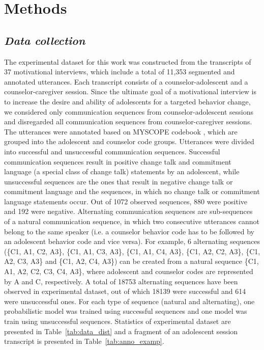 \documentclass{amia_summit_2018}
\begin{document}
\section*{Methods}
\subsection*{\textit{Data collection}}
The experimental dataset for this work was constructed from the transcripts of 37 motivational interviews, which include a total of 11,353 segmented and annotated utterances. Each transcript consists of a counselor-adolescent and a counselor-caregiver session. Since the ultimate goal of a motivational interview is to increase the desire and ability of adolescents for a targeted behavior change, we considered only communication sequences from counselor-adolescent sessions and disregarded all communication sequences from counselor-caregiver sessions. The utterances were annotated based on MYSCOPE codebook \cite{carcone2013provider}, which are grouped into the adolescent and counselor code groups. Utterances were divided into successful and unsuccessful communication sequences. Successful communication sequences result in positive change talk and commitment language (a special class of change talk) statements by an adolescent, while unsuccessful sequences are the ones that result in negative change talk or commitment language and the sequences, in which no change talk or commitment language statements occur. Out of 1072 observed sequences, 880 were positive and 192 were negative. Alternating communication sequences are sub-sequences of a natural communication sequence, in which two consecutive utterances cannot belong to the same speaker (i.e. a counselor behavior code has to be followed by an adolescent behavior code and vice versa). For example, 6 alternating sequences (\{C1, A1, C2, A3\}, \{C1, A1, C3, A3\}, \{C1, A1, C4, A3\}, \{C1, A2, C2, A3\}, \{C1, A2, C3, A3\} and \{C1, A2, C4, A3\}) can be created from a natural sequence \{C1, A1, A2, C2, C3, C4, A3\}, where adolescent and counselor codes are represented by A and C, respectively. A total of 18753 alternating sequences have been observed in experimental dataset, out of which 18139 were successful and 614 were unsuccessful ones. For each type of sequence (natural and alternating), one probabilistic model was trained using successful sequences and one model was train using unsuccessful sequences. Statistics of experimental dataset are presented in Table~\ref{tab:data_dist} and a fragment of an adolescent session transcript is presented in Table~\ref{tab:anno_examp}. \\
\end{document}
